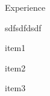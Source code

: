 \documentclass{resume}
\begin{document}
\begin{rSection}{Experience}
\begin{rSubsection}{sdfsdfd}{}{sdf}{}
\item item1
\item item2
\item item3
\end{rSubsection}
\end{rSection}
\end{document}
